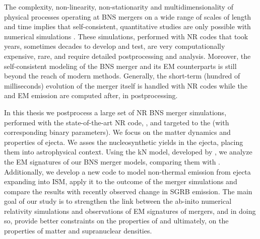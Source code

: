 The complexity, non-linearity, non-stationarity and multidimensionality of physical 
processes operating at \ac{BNS} mergers on a wide range of scales of length and time 
implies that self-consistent, quantitative studies are only possible with numerical 
simulations 
\citep{Sekiguchi:2011zd,Wanajo:2014wha,Foucart:2015gaa,Palenzuela:2015dqa,Sekiguchi:2016bjd,Kiuchi:2017zzg,Radice:2017zta,Fujibayashi:2017puw,Radice:2018pdn}.
These simulations, performed with \ac{NR} codes that took years, sometimes 
decades to develop and test, are very computationally expensive, rare, and require detailed 
postprocessing and analysis. 
%
Moreover, the self-consistent modeling of the \ac{BNS} merger and its \ac{EM} counterparts 
is still beyond the reach of modern methods. Generally, the short-term (hundred of milliseconds) 
evolution of the merger itself is handled with \ac{NR} codes while the 
\nuc{} and \ac{EM} emission are computed after, in postprocessing. 
%

In this thesis we postprocess a large set of \ac{NR} \ac{BNS} merger simulations, 
performed with the state-of-the-art \ac{NR} code, \wisky{}, and targeted to the 
\GW{} (with corresponding binary parameters).
%
We focus on the \pmerg{} matter dynamics and properties of ejecta. 
We asses the nucleosynthetic yields in the ejecta, placing them into astrophysical 
context. Using the \ac{kN} model, developed by \citet{Perego:2017wtu}, we analyze 
the \ac{EM} signatures of our \ac{BNS} merger models, comparing them with \AT{}. 
Additionally, we develop a new code to model non-thermal emission from ejecta 
expanding into \ac{ISM}, apply it to the outcome of the merger simulations and 
compare the results with recently observed change in \ac{SGRB} emission. 
%
The main goal of our study is to strengthen the link between the ab-inito 
numerical relativity simulations and observations of \ac{EM} signatures of mergers, 
and in doing so, provide better constraints on the properties of \GW{} 
and ultimately, on the properties of matter and supranuclear densities.



